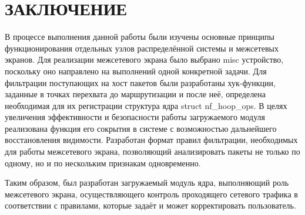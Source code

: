 \section*{ЗАКЛЮЧЕНИЕ}

В процессе выполнения данной работы были изучены основные принципы функционирования отдельных узлов распределённой системы и межсетевых экранов. Для реализации межсетевого экрана было выбрано misc устройство, поскольку оно направлено на выполнений одной конкретной задачи. Для фильтрации поступающих на хост пакетов были разработаны хук-функции, заданные в точках перехвата до маршрутизации и после неё, определена необходимая для их регистрации структура ядра struct nf\_hoop\_ops. В целях увеличения эффективности и безопасности работы загружаемого модуля реализована функция его сокрытия в системе с возможностью дальнейшего восстановления видимости. Разработан формат правил фильтрации, необходимых для работы межсетевого экрана, позволяющий анализировать пакеты не только по одному, но и по нескольким признакам одновременно.

Таким образом, был разработан загружаемый модуль ядра, выполняющий роль межсетевого экрана, осуществляющего контроль проходящего сетевого трафика в соответствии с правилами, которые задаёт и может корректировать пользователь. 

\pagebreak